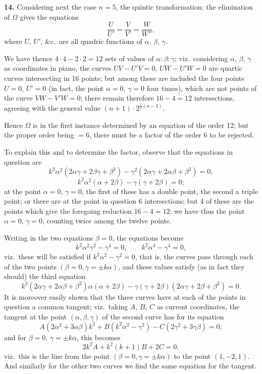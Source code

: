 \documentclass[11pt,a4paper]{book}
\begin{document}
\medskip
\noindent\textbf{14.} Considering next the case $n = 5$, the quintic transformation; the elimination of $\Omega$ gives the equations
\[
\frac{U}{U'} = \frac{V}{V'} = \frac{W}{W''},
\]
where $U$, $U'$, \&c.\ are all quadric functions of $\alpha$, $\beta$, $\gamma$.

We have thence $4 \cdot 4 - 2 \cdot 2 = 12$ sets of values of $\alpha : \beta : \gamma$; viz.\ considering $\alpha$, $\beta$, $\gamma$ as coordinates in piano, the curves $UV - U'V = 0$, $UW - U'W = 0$ are quartic curves intersecting in 16 points; but among these are included the four points $U = 0$, $U' = 0$ (in fact, the point $\alpha = 0$, $\gamma = 0$ four times), which are not points of the curve $VW - V'W = 0$; there remain therefore $16 - 4 = 12$ intersections, agreeing with the general value $(n + 1) \cdot 2^{\frac{1}{2}(n-3)}$.

Hence $\Omega$ is in the first instance determined by an equation of the order 12; but the proper order being $= 6$, there must be a factor of the order 6 to be rejected.

To explain this and to determine the factor, observe that the equations in question are
\[
k^2\alpha^2(2\alpha\gamma + 2\beta\gamma + \beta^2) - \gamma^2(2\alpha\gamma + 2\alpha\beta + \beta^2) = 0,
\]
\[
k^2\alpha^2(\alpha + 2\beta) - \gamma(\gamma + 2\beta) = 0;
\]
at the point $\alpha = 0$, $\gamma = 0$, the first of these has a double point, the second a triple point; or there are at the point in question 6 intersections; but 4 of these are the points which give the foregoing reduction $16 - 4 = 12$; we have thus the point $\alpha = 0$, $\gamma = 0$, counting twice among the twelve points.

Writing in the two equations $\beta = 0$, the equations become
\[
k^2\alpha^2\gamma^2 - \gamma^4 = 0, \qquad k^2\alpha^4 - \gamma^4 = 0,
\]
viz.\ these will be satisfied if $k^2\alpha^2 - \gamma^2 = 0$, that is, the curves pass through each of the two points $(\beta = 0, \gamma = \pm k\alpha)$, and these values satisfy (as in fact they should) the third equation
\[
k^2(2\alpha\gamma + 2\alpha\beta + \beta^2)\alpha(\alpha + 2\beta) - \gamma(\gamma + 2\beta)(2\alpha\gamma + 2\beta + \beta^2) = 0.
\]
It is moreover easily shown that the three curves have at each of the points in question a common tangent; viz.\ taking $A$, $B$, $C$ as current coordinates, the tangent at the point $(\alpha, \beta, \gamma)$ of the second curve has for its equation
\[
A(2\alpha^2 + 3\alpha\beta)k^2 + B(k^2\alpha^2 - \gamma^2) - C(2\gamma^2 + 3\gamma\beta) = 0;
\]
and for $\beta = 0$, $\gamma = \pm k\alpha$, this becomes
\[
2k^2A + k^2(k + 1)B + 2C = 0,
\]
viz.\ this is the line from the point $(\beta = 0, \gamma = \pm k\alpha)$ to the point $(1, -2, 1)$. And similarly for the other two curves we find the same equation for the tangent.
\end{document}
